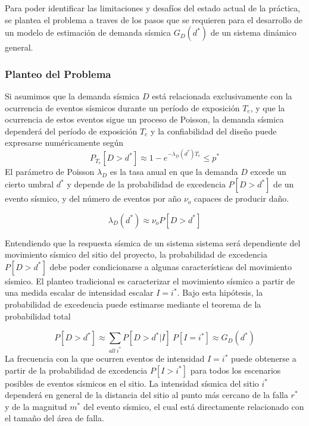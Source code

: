 \documentclass[
]{krantz}
\begin{document}
Para poder identificar las limitaciones y desafíos del estado actual de la práctica, se plantea el problema a traves de los pasos que se requieren para el desarrollo de un modelo de estimación de demanda sísmica \(G_D(d^*)\) de un sistema dinámico general.

\hypertarget{planteo-del-problema}{%
\subsubsection*{Planteo del Problema}\label{planteo-del-problema}}

Si asumimos que la demanda sísmica \(D\) está relacionada exclusivamente con la ocurrencia de eventos sísmicos durante un período de exposición \(T_e\), y que la ocurrencia de estos eventos sigue un proceso de Poisson, la demanda sísmica dependerá del período de exposición \(T_e\) y la confiabilidad del diseño puede expresarse numéricamente según \[P_{T_e}\left [D > d^*  \right ]\approx 1-e^{-\lambda_D(d^*) T_e}\leq p^*\] El parámetro de Poisson \(\lambda_D\) es la tasa anual en que la demanda \(D\) excede un cierto umbral \(d^*\) y depende de la probabilidad de excedencia \(P\left [D>d^* \right ]\) de un evento sísmico, y del número de eventos por año \(\nu_o\) capaces de producir daño.

\[ \begin{equation}
\lambda_D(d^*) \approx \nu_o P\left [D>d^* \right ] 
\end{equation}\]

Entendiendo que la respuesta sísmica de un sistema sistema será dependiente del movimiento sísmico del sitio del proyecto, la probabilidad de excedencia \(P\left [ D>d^* \right ]\) debe poder condicionarse a algunas características del movimiento sísmico. El planteo tradicional es caracterizar el movimiento sísmico a partir de una medida escalar de intensidad escalar \(I=i^*\). Bajo esta hipótesis, la probabilidad de excedencia puede estimarse mediante el teorema de la probabilidad total

\[ \begin{equation} 
P\left [ D>d^* \right ] \approx \sum^{}_{all\  i^{\ast }}  P\left [D > d^*|I \right ] \ P\left [I=i^*  \right ] \approx G_D(d^*)
\end{equation}\] La frecuencia con la que ocurren eventos de intensidad \(I=i^*\) puede obtenerse a partir de la probabilidad de excedencia \(P\left [ I>i^* \right ]\) para todos los escenarios posibles de eventos sísmicos en el sitio. La intensidad sísmica del sitio \(i^*\) dependerá en general de la distancia del sitio al punto más cercano de la falla \(r^*\) y de la magnitud \(m^*\) del evento sísmico, el cual está directamente relacionado con el tamaño del área de falla.
\end{document}
